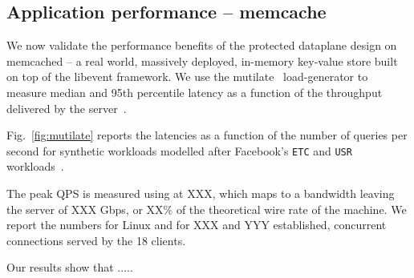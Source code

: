 
\subsection{Application performance -- memcache}
\label{sec:eval:memcached}




We now validate the performance benefits of the protected dataplane
design on memcached -- a real world, massively deployed, in-memory
key-value store built on top of the libevent framework.  We use the
mutilate~\cite{url:mutilate} load-generator to measure median and 95th
percentile latency as a function of the throughput delivered by the
server~\cite{Leverich:RHSU:2014}. 

Fig.~\ref{fig:mutilate} reports the latencies as a function of the
number of queries per second for synthetic workloads modelled after
Facebook's \texttt{ETC} and \texttt{USR} workloads~\cite{Atikoglu:2012:WAL}.

 The peak QPS is measured using \ix at
XXX, which maps to a bandwidth leaving the server of XXX Gbps, or XX\%
of the theoretical wire rate of the machine.  We report the numbers
for Linux and \ix for XXX and YYY established, concurrent
connections served by the 18 clients.

Our results show that .....


%
